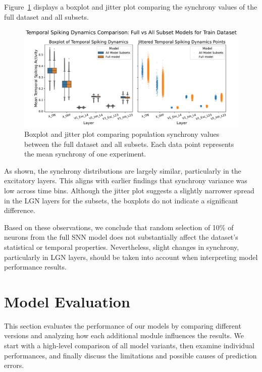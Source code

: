 Figure~\ref{fig:boxplot_synchrony_subset} displays a boxplot and jitter plot comparing the synchrony values of the full dataset and all subsets.

\begin{figure}
    \centering
    \includegraphics[width=\linewidth]{img/plots/synchrony_comparison_subset_full_train.pdf}
    \caption{Boxplot and jitter plot comparing population synchrony values between the full dataset and all subsets. Each data point represents the mean synchrony of one experiment.}
    \label{fig:boxplot_synchrony_subset}
\end{figure}

As shown, the synchrony distributions are largely similar, particularly in the excitatory layers. This aligns with earlier findings that synchrony variance was low across time bins. Although the jitter plot suggests a slightly narrower spread in the LGN layers for the subsets, the boxplots do not indicate a significant difference.

Based on these observations, we conclude that random selection of 10\% of neurons from the full SNN model does not substantially affect the dataset's statistical or temporal properties. Nevertheless, slight changes in synchrony, particularly in LGN layers, should be taken into account when interpreting model performance results.

\section{Model Evaluation}
\label{sec:model_evaluation}

This section evaluates the performance of our models by comparing different versions and analyzing how each additional module influences the results. We start with a high-level comparison of all model variants, then examine individual performances, and finally discuss the limitations and possible causes of prediction errors.

